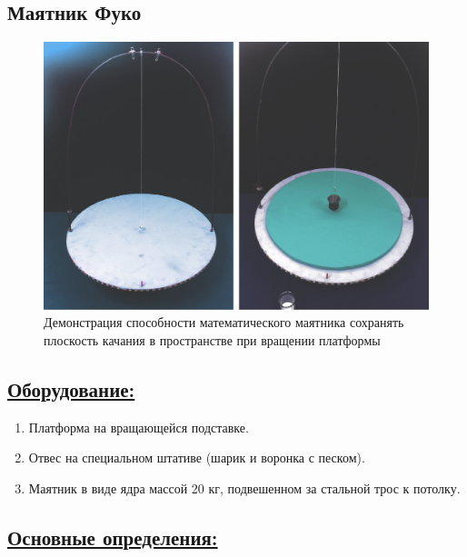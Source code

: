\documentclass[14pt,a4paper,oneside]{extarticle}	%
\begin{document}
	
	\begin{center}
		\subsection*{Маятник Фуко}
	\end{center}
		

\begin{figure}[H] 	
	\centering 	
	\includegraphics[width=0.9\linewidth]{fuko-1.png}
	\caption{Демонстрация способности математического маятника сохранять плоскость качания в пространстве при вращении платформы}
	\label{fuko-1}
\end{figure}
	
	\subsection*{\underline{Оборудование:}}

		\begin{enumerate}
			\item Платформа на вращающейся подставке.
			\item Отвес на специальном штативе (шарик и воронка с песком).
			\item Маятник в виде ядра массой 20 кг, подвешенном за стальной трос к потолку.
		\end{enumerate}

	\newpage
		\subsection*{\underline{Основные определения:}}
		
\end{document}
